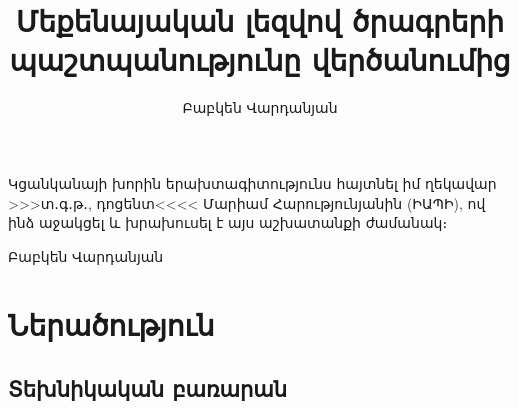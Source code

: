 \documentclass[11pt]{article}
\author{Բաբկեն Վարդանյան}
\title{Մեքենայական լեզվով ծրագրերի պաշտպանությունը վերծանումից}
\begin{document}
\setcounter{page}{2}
Կցանկանայի խորին երախտագիտությունս հայտնել իմ ղեկավար >>>տ․գ․թ․, դոցենտ<<<<
Մարիամ Հարությունյանին (ԻԱՊԻ), ով ինձ աջակցել և խրախուսել է այս աշխատանքի
ժամանակ։

\hfill \hfill Բաբկեն Վարդանյան

\newpage

\tableofcontents

\section{Ներածություն}
\begin{sloppypar}
\subsection{Տեխնիկական բառարան}


\end{sloppypar}
\end{document}
